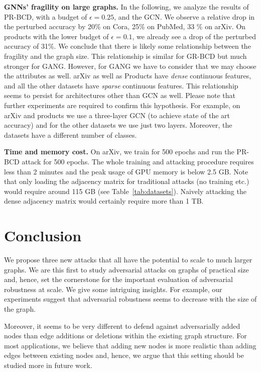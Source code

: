 \documentclass[letterpaper]{article} %
\begin{document}
\textbf{GNNs' fragility on large graphs.} In the following, we analyze the results of PR-BCD, with a budget of \(\epsilon=0.25\), and the GCN. We observe a relative drop in the perturbed accuracy by 20\% on Cora, 25\% on PubMed, 33 \% on arXiv. On products with the lower budget of \(\epsilon=0.1\), we already see a drop of the perturbed accuracy of 31\%. We conclude that there is likely some relationship between the fragility and the graph size. This relationship is similar for GR-BCD but much stronger for GANG. However, for GANG we have to consider that we may choose the attributes as well. arXiv as well as Products have \textit{dense} continuous features, and all the other datasets have \textit{sparse} continuous features. This relationship seems to persist for architectures other than GCN as well. Please note that further experiments are required to confirm this hypothesis. For example, on arXiv and products we use a three-layer GCN (to achieve state of the art accuracy) and for the other datasets we use just two layers. Moreover, the datasets have a different number of classes.

\textbf{Time and memory cost.} On arXiv, we train for 500 epochs and run the PR-BCD attack for 500 epochs. The whole training and attacking procedure requires less than 2 minutes and the peak usage of GPU memory is below 2.5 GB. 
Note that only loading the adjacency matrix for traditional attacks (no training etc.) would require around 115 GB (see Table~\ref{tab:datasets}). Naively attacking the dense adjacency matrix would certainly require more than 1 TB.

\section{Conclusion}\label{sec:conclusion} %

We propose three new attacks that all have the potential to scale to much larger graphs. We are this first to study adversarial attacks on graphs of practical size and, hence, set the cornerstone for the important evaluation of adversarial robustness at scale. We give some intriguing insights. For example, our experiments suggest that adversarial robustness seems to decrease with the size of the graph.

Moreover, it seems to be very different to defend against adversarially added nodes than edge additions or deletions within the existing graph structure. For most applications, we believe that adding new nodes is more realistic than adding edges between existing nodes and, hence, we argue that this setting should be studied more in future work.


\end{document}
